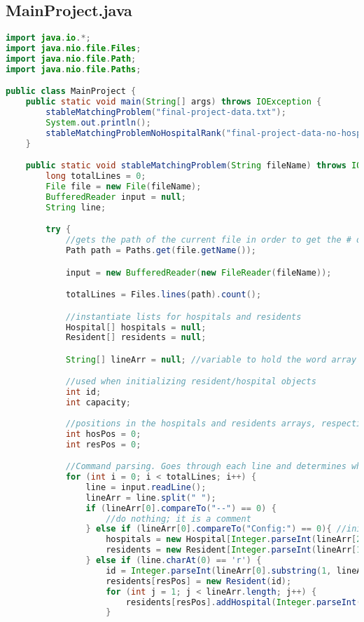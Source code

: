 \documentclass[letterpaper, 10pt,DIV=13]{scrartcl}
\numberwithin{equation}{section} %
\numberwithin{figure}{section} %
\numberwithin{table}{section} %
\begin{document}
\subsection{MainProject.java}
\begin{lstlisting}[frame=single, language=java, breaklines]
import java.io.*;
import java.nio.file.Files;
import java.nio.file.Path;
import java.nio.file.Paths;

public class MainProject {
    public static void main(String[] args) throws IOException {
        stableMatchingProblem("final-project-data.txt");
        System.out.println();
        stableMatchingProblemNoHospitalRank("final-project-data-no-hospital-rank.txt");
    }

    public static void stableMatchingProblem(String fileName) throws IOException {
        long totalLines = 0;
        File file = new File(fileName);
        BufferedReader input = null;
        String line;

        try {
            //gets the path of the current file in order to get the # of lines
            Path path = Paths.get(file.getName());

            input = new BufferedReader(new FileReader(fileName)); 

            totalLines = Files.lines(path).count();

            //instantiate lists for hospitals and residents
            Hospital[] hospitals = null;
            Resident[] residents = null;

            String[] lineArr = null; //variable to hold the word array of the current line

            //used when initializing resident/hospital objects
            int id;
            int capacity;
            
            //positions in the hospitals and residents arrays, respectively
            int hosPos = 0;
            int resPos = 0; 

            //Command parsing. Goes through each line and determines what command is being used based on strings.
            for (int i = 0; i < totalLines; i++) {
                line = input.readLine();
                lineArr = line.split(" ");
                if (lineArr[0].compareTo("--") == 0) {
                    //do nothing; it is a comment
                } else if (lineArr[0].compareTo("Config:") == 0){ //initialize the array size of the total hospitals and residents
                    hospitals = new Hospital[Integer.parseInt(lineArr[2])];
                    residents = new Resident[Integer.parseInt(lineArr[1])];
                } else if (line.charAt(0) == 'r') {
                    id = Integer.parseInt(lineArr[0].substring(1, lineArr[0].length() - 1));
                    residents[resPos] = new Resident(id);
                    for (int j = 1; j < lineArr.length; j++) {
                        residents[resPos].addHospital(Integer.parseInt(lineArr[j].substring(1)));
                    }


\end{lstlisting}
\end{document}
